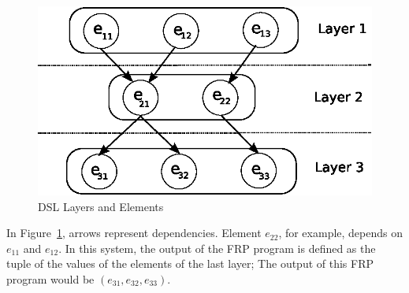 \documentclass[twocolumn,11pt,english]{article}
\begin{document}
\begin{figure}[h!]
  \includegraphics[scale=0.8]{layers.eps}
\caption{DSL Layers and Elements}
\label{fig:layers}
\end{figure}

In Figure~\ref{fig:layers}, arrows represent dependencies. Element $e_{22}$, for example, depends on $e_{11}$ and $e_{12}$. In this system, the output of the FRP program is defined as the tuple of the values of the elements of the last layer; The output of this FRP program would be $(e_{31}, e_{32}, e_{33})$.
\end{document}
